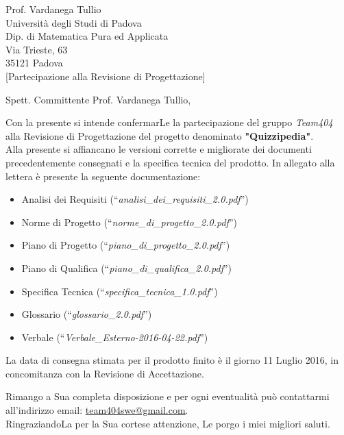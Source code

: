 \documentclass[boldsubject,shortindent,a4paper,11pt]{letteracdp}
\date{16 Maggio 2016}
\begin{document}
\begin{letter}{	Prof. Vardanega Tullio \\
				Universit\`a degli Studi di Padova \\
				Dip. di Matematica Pura ed Applicata \\
				Via Trieste, 63 \\
				35121 Padova\\
				}
[Partecipazione alla Revisione di Progettazione]
\opening{Spett. Committente Prof. Vardanega Tullio,}
\noindent
Con la presente si intende confermarLe la partecipazione del gruppo \emph{Team404} alla Revisione di Progettazione del progetto denominato \textbf{"Quizzipedia"}.
\\
\noindent
Alla presente si affiancano le versioni corrette e migliorate dei documenti precedentemente consegnati e la specifica tecnica del prodotto.
\newline
\noindent
In allegato alla lettera è presente la seguente documentazione:
\begin{itemize}
	\item Analisi dei Requisiti (``\textit{analisi\_dei\_requisiti\_2.0.pdf}'')
	\item Norme di Progetto (``\textit{norme\_di\_progetto\_2.0.pdf}'')
	\item Piano di Progetto (``\textit{piano\_di\_progetto\_2.0.pdf}'')
	\item Piano di Qualifica (``\textit{piano\_di\_qualifica\_2.0.pdf}'')
	\item Specifica Tecnica (``\textit{specifica\_tecnica\_1.0.pdf}'')
	\item Glossario (``\textit{glossario\_2.0.pdf}'')
	\item Verbale (``\textit{Verbale\_Esterno-2016-04-22.pdf}'')
\end{itemize}

\noindent

La data di consegna stimata per il prodotto finito è il giorno 11 Luglio 2016, in concomitanza con la Revisione di Accettazione.

\closing{Rimango a Sua completa disposizione e per ogni eventualit\`a pu\`o contattarmi all'indirizzo email: \url{team404swe@gmail.com}.\\RingraziandoLa per la Sua cortese attenzione, Le porgo i miei migliori saluti.}
\end{letter}
\end{document}
